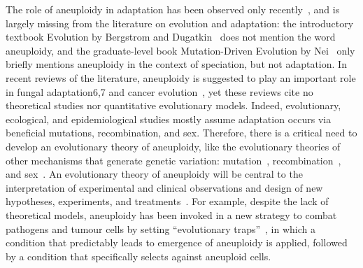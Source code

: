 \documentclass[12pt]{extarticle}
\begin{document}
The role of aneuploidy in adaptation has been observed only recently~\citep{Yona2012, Gerstein2015, Sionov2010}, and is largely missing from the literature on evolution and adaptation:
the introductory textbook Evolution by Bergstrom and Dugatkin~\citet{Bergstrom2012} does not mention the word aneuploidy, and the graduate-level book Mutation-Driven Evolution by Nei~\citet{Nei2013} only briefly mentions aneuploidy in the context of speciation, but not adaptation.
In recent reviews of the literature, aneuploidy is suggested to play an important role in fungal adaptation6,7 and cancer evolution~\citep{Santaguida2015, Naylor2016, Sansregret2017}, yet these reviews cite no theoretical studies nor quantitative evolutionary models.
Indeed, evolutionary, ecological, and epidemiological studies mostly assume adaptation occurs via beneficial mutations, recombination, and sex.
Therefore, there is a critical need to develop an evolutionary theory of aneuploidy, like the evolutionary theories of other mechanisms that generate genetic variation: mutation~\citep{Lynch2010}, recombination~\citep{Hartfield2012}, and sex~\citep{Otto2009}.
An evolutionary theory of aneuploidy will be central to the interpretation of experimental and clinical observations and design of new hypotheses, experiments, and treatments~\citep{Carja2014}.
For example, despite the lack of theoretical models, aneuploidy has been invoked in a new strategy to combat pathogens and tumour cells by setting “evolutionary traps”~\citep{Gerstein2015,Chen2015}, in which a condition that predictably leads to emergence of aneuploidy is applied, followed by a condition that specifically selects against aneuploid cells.
\end{document}
